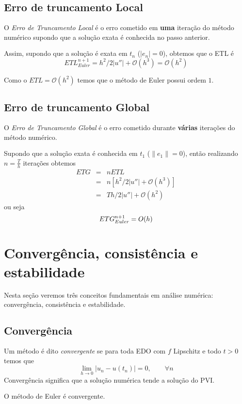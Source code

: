 \subsection{Erro de truncamento Local}

O \emph{Erro de Truncamento Local} é o erro cometido em \textbf{uma} iteração do método numérico supondo que a solução exata é conhecida no passo anterior.

Assim, supondo que a solução é exata em $t_n$ ($|e_n|=0$), obtemos que o ETL é
$$ETL_{Euler}^{n+1}= h^2/2|u''|+ \mathcal O(h^3) = \mathcal O(h^2)$$

Como o $ETL=\mathcal O(h^2)$ temos que o método de Euler possui ordem $1$.


\subsection{Erro de truncamento Global}
O \emph{Erro de Truncamento Global} é o erro cometido durante \textbf{várias} iterações do método numérico.

Supondo que a solução exata é conhecida em $t_1$ ($\|e_1\|=0$), então realizando $n=\frac{T}{h}$ iterações obtemos
\begin{eqnarray}
   ETG &=& nETL \\
       &=& n[h^2/2|u''|+ \mathcal O(h^3)] \\
       &=& Th/2|u''|+ \mathcal O(h^2)
\end{eqnarray}
ou seja
$$ETG_{Euler}^{n+1} = \mathcal \mathcal{O}(h)$$



\section{Convergência, consistência e estabilidade}
Nesta seção veremos três conceitos fundamentais em análise numérica: convergência, consistência e estabilidade.

\subsection{Convergência}
Um método é dito \emph{convergente} se para toda EDO com $f$ Lipschitz e todo $t>0$ temos que
$$ \lim_{h \rightarrow 0} |u_n - u(t_n)| =0, \quad \quad \forall n$$
Convergência significa que a solução numérica tende a solução do PVI.


\begin{teo}
O método de Euler é convergente.
\end{teo}

